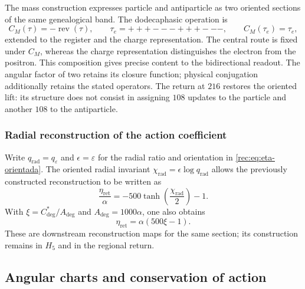 The mass construction expresses particle and antiparticle as two oriented
sections of the same genealogical band. The dodecaphasic operation is
\begin{equation}
 C_M(\tau)=-\operatorname{rev}(\tau),
 \qquad \tau_e=+++---+++---,
 \qquad C_M(\tau_e)=\tau_e,
 \label{md:compos:conjugacion-dodecafasica}
\end{equation}
extended to the register and the charge representation. The central route
is fixed under $C_M$, whereas the charge representation distinguishes the
electron from the positron. This composition gives precise content to the
bidirectional readout. The angular factor of two retains its closure
function; physical conjugation additionally retains the stated operators.
The return at $216$ restores the oriented lift: its structure does not
consist in assigning $108$ updates to the particle and another $108$ to
the antiparticle.

\subsubsection{Radial reconstruction of the action coefficient}
\label{md:compos:quinientos}

Write $q_{\mathrm{rad}}=q_\varepsilon$ and $\epsilon=\varepsilon$ for the
radial ratio and orientation in \eqref{rec:eq:eta-orientada}.
The oriented radial invariant $\chi_{\mathrm{rad}}=\epsilon\log q_{\mathrm{rad}}$
allows the previously constructed reconstruction to be written as
\begin{equation}
 \frac{\eta_{\mathrm{ret}}}{\alpha}
 =-500\tanh\!\left(\frac{\chi_{\mathrm{rad}}}{2}\right)-1.
 \label{md:compos:restitucion-radial}
\end{equation}
With $\xi=C^*_{\deg}/A_{\deg}$ and $A_{\deg}=1000\alpha$, one also obtains
\begin{equation}
 \eta_{\mathrm{ret}}=\alpha(500\xi-1).
 \label{md:compos:restitucion-xi}
\end{equation}
These are downstream reconstruction maps for the same section; its
construction remains in $H_5$ and in the regional return.

\subsection{Angular charts and conservation of action}
\label{md:compos:cartas}

